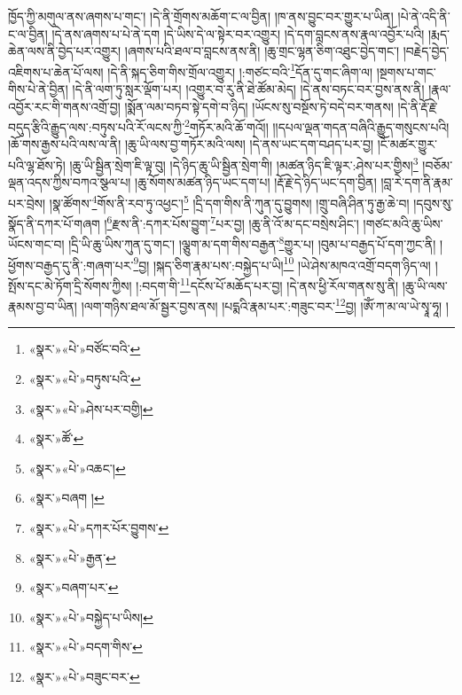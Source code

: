 ཁྱོད་ཀྱི་མགུལ་ནས་ཞགས་པ་གང་། །དེ་ནི་གྲོགས་མཆོག་ང་ལ་བྱིན། །ཁ་ནས་བྱུང་བར་གྱུར་པ་ཡིན། །པེ་ནེ་འདི་ནི་ང་ལ་བྱིན། །དེ་ནས་ཞགས་པ་པེ་ནེ་དག །དེ་ཡིས་དེ་ལ་སྟེར་བར་འགྱུར། །དེ་དག་བླངས་ནས་རྣལ་འབྱོར་པའི། །རྨད་ཆེན་ལས་ནི་བྱེད་པར་འགྱུར། །ཞགས་པའི་ཐལ་བ་བླངས་ནས་ནི། །ཆུ་གྲང་ལྷན་ཅིག་འཐུང་བྱེད་གང་། །བརྗེད་བྱེད་འཇིགས་པ་ཆེན་པོ་ལས། །དེ་ནི་སྐད་ཅིག་གིས་གྲོལ་འགྱུར། །:གཙང་བའི་\footnote{«སྣར་»«པེ་»བཙོང་བའི་}དོན་དུ་གང་ཞིག་ལ། །སྔགས་པ་གང་གིས་པེ་ནེ་བྱིན། །དེ་ནི་ལག་ཏུ་སླར་ལྡོག་པར། །འགྱུར་བ་རུ་ནི་ཐེ་ཚོམ་མེད། །དེ་ནས་བཏང་བར་བྱས་ནས་ནི། །རྣལ་འབྱོར་རང་གི་གནས་འགྲོ་བྱ། །སྨོན་ལམ་བཏབ་སྟེ་དགེ་བ་ཉིད། །ཡོངས་སུ་བསྔོས་ཏེ་བདེ་བར་གནས། །དེ་ནི་རྡོ་རྗེ་བདུད་རྩིའི་རྒྱུད་ལས་:བཏུས་པའི་རོ་ལངས་ཀྱི་\footnote{«སྣར་»«པེ་»བཏུས་པའི་}གཏོར་མའི་ཆོ་གའོ།། །།དཔལ་ལྡན་གདན་བཞིའི་རྒྱུད་གསུངས་པའི། །ཆོ་གས་རྒྱས་པའི་ལས་ལ་ནི། །ཆུ་ཡི་ལས་བྱ་གཏོར་མའི་ལས། །དེ་ནས་ཡང་དག་བཤད་པར་བྱ། །ངོ་མཚར་གྱུར་པའི་ལྷ་ཐོས་ཏེ། །ཆུ་ཡི་སྦྱིན་སྲེག་ཇི་ལྟ་བུ། །དེ་ཉིད་ཆུ་ཡི་སྦྱིན་སྲེག་གི། །མཚན་ཉིད་ཇི་ལྟར་:ཤེས་པར་གྱིས།\footnote{«སྣར་»«པེ་»ཤེས་པར་བགྱི།} །བཅོམ་ལྡན་འདས་ཀྱིས་བཀའ་སྩལ་པ། །ཆུ་སོགས་མཚན་ཉིད་ཡང་དག་པ། །རྡོ་རྗེ་དེ་ཉིད་ཡང་དག་བྱིན། །བླ་རེ་དག་ནི་རྣམ་པར་བྲེས། །སྣ་ཚོགས་\footnote{«སྣར་»ཚོ་}གོས་ནི་རབ་ཏུ་འཕྱང་།\footnote{«སྣར་»«པེ་»འཆང་།} །དྲི་དག་གིས་ནི་ཀུན་དུ་བྱུགས། །གྲུ་བཞི་ཤིན་ཏུ་རྒྱ་ཆེ་བ། །དབུས་སུ་སྣོད་ནི་དཀར་པོ་གཞག །\footnote{«སྣར་»བཞག །}རྫས་ནི་:དཀར་པོས་བྱུག་\footnote{«སྣར་»«པེ་»དཀར་པོར་བྱུགས་}པར་བྱ། །ཆུ་ནི་འོ་མ་དང་བསྲེས་ཤིང་། །གཙང་མའི་ཆུ་ཡིས་ཡོངས་གང་བ། །དྲི་ཡི་ཆུ་ཡིས་ཀུན་དུ་གང་། །ལྕུག་མ་དག་གིས་བརྒྱན་\footnote{«སྣར་»«པེ་»རྒྱན་}གྱུར་པ། །བུམ་པ་བརྒྱད་པོ་དག་ཀྱང་ནི། །ཕྱོགས་བརྒྱད་དུ་ནི་:གཞག་པར་\footnote{«སྣར་»བཞག་པར་}བྱ། །སྐད་ཅིག་རྣམ་པས་:བསྐྱེད་པ་ཡི།\footnote{«སྣར་»«པེ་»བསྐྱེད་པ་ཡིས།} །ཡེ་ཤེས་མཁའ་འགྲོ་བདག་ཉིད་ལ། །སྤོས་དང་མེ་ཏོག་དྲི་སོགས་ཀྱིས། །:བདག་གི་\footnote{«སྣར་»«པེ་»བདག་གིས་}དངོས་པོ་མཆོད་པར་བྱ། །དེ་ནས་ཕྱི་རོལ་གནས་སུ་ནི། །ཆུ་ཡི་ལས་རྣམས་བྱ་བ་ཡིན། །ལག་གཉིས་ཐལ་མོ་སྦྱར་བྱས་ནས། །པདྨའི་རྣམ་པར་:གཟུང་བར་\footnote{«སྣར་»«པེ་»བཟུང་བར་}བྱ། །ཨོཾ་ཀ་མ་ལ་ཡེ་སྭཱ་ཧཱ། །
